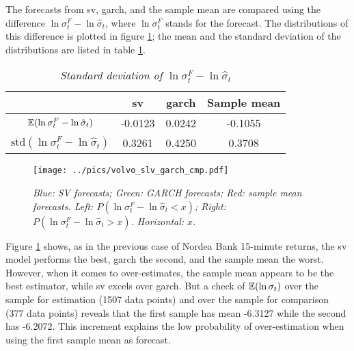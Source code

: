 The forecasts from \gls{sv}, \gls{garch}, and the sample mean are compared
using the difference $\ln \sigma^F_t - \ln\hat{\sigma}_t$, where $\ln
\sigma^F_t$ stands for the forecast. The distributions of this
difference is plotted in figure \ref{fig:volvo_slv_garch_cmp}; the
mean and the standard deviation of the distributions are listed in
table \ref{tab:volvo_slv_garch_cmp}.
\begin{table}[htb!]
  \centering
  \begin{tabular}{|c|c|c|c|}
    \hline
    & \gls{sv} & \gls{garch} & Sample mean \\
    \hline
    $\mathbb{E}(\ln \sigma^F_t - \ln \hat{\sigma}_t)$ & -0.0123 &
    0.0242 & -0.1055 \\
    \hline
    $\text{std}(\ln \sigma^F_t - \ln \hat{\sigma}_t)$ & 0.3261 &
    0.4250 & 0.3708 \\
    \hline
  \end{tabular}
  \caption{\small \it Standard deviation of $\ln\sigma^F_t -
    \ln\hat{\sigma}_t$}
  \label{tab:volvo_slv_garch_cmp}
\end{table}

\begin{figure}[htb!]
  \centering
  \texttt{[image: ../pics/volvo\_slv\_garch\_cmp.pdf]}
  \caption{\small \it Blue: SV forecasts; Green: GARCH forecasts; Red:
    sample mean forecasts. Left: $P(\ln \sigma^F_t - \ln
    \hat{\sigma}_t < x)$; Right: $P(\ln \sigma^F_t - \ln
    \hat{\sigma}_t > x)$. Horizontal: $x$.}
  \label{fig:volvo_slv_garch_cmp}
\end{figure}
Figure \ref{fig:volvo_slv_garch_cmp} shows, as in the previous case of
Nordea Bank 15-minute returns, the \gls{sv} model performs the best, \gls{garch}
the second, and the sample mean the worst. However, when it comes to
over-estimates, the sample mean appears to be the best estimator,
while \gls{sv} excels over \gls{garch}. But a check of $\mathbb{E}(\ln\sigma_t)$ over
the sample for estimation (1507 data points) and over the sample for
comparison (377 data points) reveals that the first sample has mean
-6.3127 while the second has -6.2072. This increment explains the low
probability of over-estimation when using the first sample mean as
forecast. 

